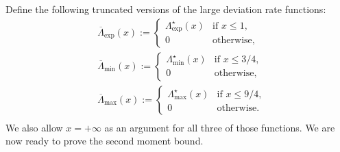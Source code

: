 \documentclass[11pt]{article}
\numberwithin{equation}{section}
\newcommand{\be}{\begin{equation}}
\newcommand{\ee}{\end{equation}}
\newcommand{\ba}{\begin{aligned}}
\newcommand{\ea}{\end{aligned}}
\theoremstyle{definition}
\begin{document}
Define the following truncated versions of the large deviation rate functions: 
    \be\ba\label{eq:barfunc}
        & \overline{\Lambda}_{\exp}(x) := \begin{cases} \Lambda_{\exp}^{\star} (x) & \mbox{if } x \leq 1,\\
        0 & \mbox{otherwise},
        \end{cases}\\
        & \overline{\Lambda}_{\min}(x) := \begin{cases} \Lambda_{\min}^{\star} (x) & \mbox{if } x \leq 3/4,\\
        0 & \mbox{otherwise},
        \end{cases}\\
        & \overline{\Lambda}_{\max}(x) := \begin{cases} \Lambda_{\max}^{\star} (x) & \mbox{if }x \leq 9/4,\\
        0 & \mbox{otherwise.}
        \end{cases}\\
    \ea\ee
    We also allow $x=+\infty$ as an argument for all three of those functions.
We are now ready to prove the second moment bound.
\end{document}
